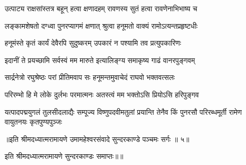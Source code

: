 \twolineshloka
{उत्पाट्य राक्षसांस्तत्र बहून् हत्वा क्षणादहम्}
{रावणस्य सुतं हत्वा रावणेनाभिभाष्य च} %

\twolineshloka
{लङ्कामशेषतो दग्ध्वा पुनरप्यागमं क्षणात्}
{श्रुत्वा हनूमतो वाक्यं रामोऽत्यन्तप्रहृष्टधीः} %

\twolineshloka
{हनूमंस्ते कृतं कार्यं देवैरपि सुदुष्करम्}
{उपकारं न पश्यामि तव प्रत्युपकारिणः} %

\twolineshloka
{इदानीं ते प्रयच्छामि सर्वस्वं मम मारुते}
{इत्यालिङ्ग्य समाकृष्य गाढं वानरपुङ्गवम्} %

\twolineshloka
{सार्द्रनेत्रो रघुश्रेष्ठः परां प्रीतिमवाप सः}
{हनूमन्तमुवाचेदं राघवो भक्तवत्सलः} %

\twolineshloka
{परिरम्भो हि मे लोके दुर्लभः परमात्मनः}
{अतस्त्वं मम भक्तोऽसि प्रियोऽसि हरिपुङ्गव} %

\fourlineindentedshloka
{यत्पादपद्मयुगलं तुलसीदलाद्यैः}
{सम्पूज्य विष्णुपदवीमतुलां प्रयान्ति}
{तेनैव किं पुनरसौ परिरब्धमूर्ती}
{रामेण वायुतनयः कृतपुण्यपुञ्जः} %

{॥इति श्रीमदध्यात्मरामायणे उमामहेश्वरसंवादे सुन्दरकाण्डे
पञ्चमः सर्गः ॥ ५॥
}

इति श्रीमदध्यात्मरामायणे सुन्दरकाण्डः समाप्तः॥॥
